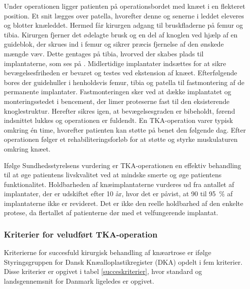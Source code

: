Under operationen ligger patienten på operationsbordet med knæet i en flekteret position. Et snit lægges over patella, hvorefter denne og senerne i leddet eleveres og blotter knæleddet. Hermed får kirurgen adgang til bruskfladerne på femur og tibia. Kirurgen fjerner det ødelagte brusk og en del af knoglen ved hjælp af en guideblok, der skrues ind i femur og sikrer præcis fjernelse af den ønskede mængde væv. Dette gentages på tibia, hvorved der skabes plads til implantaterne, som ses på . Midlertidige implantater indsættes for at sikre bevægelsesfriheden er bevaret og testes ved ekstension af knæet. Efterfølgende bores der guidehuller i henholdsvis femur, tibia og patella til fastmontering af de permanente implantater. Fastmonteringen sker ved at dække implantatet og monteringsstedet i bencement, der limer proteserne fast til den eksisterende knoglestruktur. Herefter sikres igen, at bevægelsesgraden er bibeholdt, førend indsnittet lukkes og operationen er fuldendt. En TKA-operation varer typisk omkring én time, hvorefter patienten kan støtte på benet den følgende dag. Efter operationen følger et rehabiliteringsforløb for at støtte og styrke muskulaturen omkring knæet. \citep{Sanna2013} \citep{tka-technique}

Ifølge Sundhedsstyrelsens vurdering er TKA-operationen en effektiv behandling til at øge patientens livskvalitet ved at mindske smerte og øge patientens funktionalitet. Holdbarheden af knæimplantaterne vurderes ud fra antallet af implantater, der er udskiftet efter 10 år, hvor det er påvist, at 90 til 95~\% af implantaterne ikke er revideret. Det er ikke den reelle holdbarhed af den enkelte protese, da flertallet af patienterne dør med et velfungerende implantat. \citep{brostrom2012}

\subsubsection{Kriterier for veludført TKA-operation}\label{tek_succes}
Kriterierne for succesfuld kirurgisk behandling af knæartrose er ifølge Styringsgruppen for Dansk Knæalloplastikregister (DKA) opdelt i fem kriterier. \citep{aarsrapport2016} Disse kriterier er opgivet i tabel \ref{succeskriterier}, hvor standard og landsgennemsnit for Danmark ligeledes er opgivet. 

